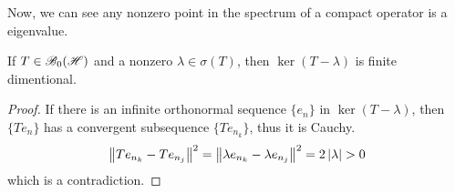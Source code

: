 \documentclass[a4paper,11pt]{report}
\begin{document}
Now, we can see any nonzero point in the spectrum of a compact operator is a eigenvalue.

\begin{lem}
	If $T \in \mathscr{B}_{0}\mathscr{(H)}$ and a nonzero $\lambda \in \sigma(T)$, then $\ker{(T-\lambda)}$ is finite dimentional.
\end{lem}
\begin{proof}
	If there is an infinite orthonormal sequence $\{e_n\}$ in $\ker{(T-\lambda)}$, then $\{Te_n\}$ has a convergent subsequence $\{Te_{n_k}\}$, thus it is Cauchy.
	\begin{equation*}
		\left\lVert Te_{n_k}-Te_{n_j}\right\lVert^2 = \left\lVert\lambda e_{n_k}-\lambda e_{n_j}\right\lVert^2 = 2 \left\lvert\lambda\right\lvert > 0
	\end{equation*}
	which is a contradiction.
\end{proof}
\end{document}
